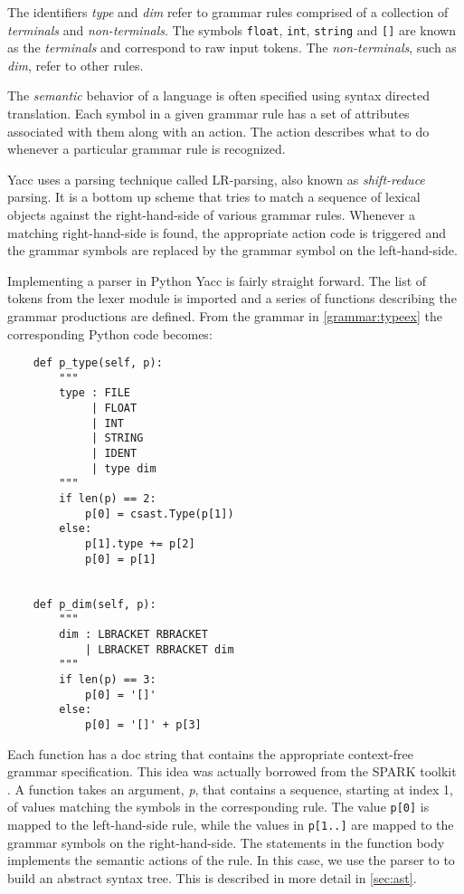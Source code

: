 \noindent The identifiers \emph{type} and \emph{dim} refer to grammar
rules comprised of a collection of \emph{terminals} and
\emph{non-terminals}. The symbols \texttt{float}, \texttt{int},
\texttt{string} and \texttt{[]} are known as the \emph{terminals}
and correspond to raw input tokens. The \emph{non-terminals}, such as
\emph{dim}, refer to other rules.

The \emph{semantic} behavior of a language is often specified using
syntax directed translation. Each symbol in a given grammar rule has a
set of attributes associated with them along with an action. The
action describes what to do whenever a particular grammar rule is
recognized.

Yacc uses a parsing technique called LR-parsing, also known as
\emph{shift-reduce} parsing. It is a bottom up scheme that tries to
match a sequence of lexical objects against the right-hand-side of
various grammar rules. Whenever a matching right-hand-side is found,
the appropriate action code is triggered and the grammar symbols are
replaced by the grammar symbol on the left-hand-side.

Implementing a parser in Python Yacc is fairly straight forward. The
list of tokens from the lexer module is imported and a series of
functions describing the grammar productions are defined. From the
grammar in \autoref{grammar:typeex} the corresponding Python code
becomes:

\begin{lstlisting}
    def p_type(self, p):
        """
        type : FILE
             | FLOAT
             | INT
             | STRING
             | IDENT
             | type dim
        """
        if len(p) == 2:
            p[0] = csast.Type(p[1])
        else:
            p[1].type += p[2]
            p[0] = p[1]


    def p_dim(self, p):
        """
        dim : LBRACKET RBRACKET
            | LBRACKET RBRACKET dim
        """
        if len(p) == 3:
            p[0] = '[]'
        else:
            p[0] = '[]' + p[3]
\end{lstlisting}

Each function has a doc string that contains the appropriate
context-free grammar specification. This idea was actually borrowed
from the SPARK toolkit \citep{spark:online}. A function takes an
argument, \emph{p}, that contains a sequence, starting at index 1, of
values matching the symbols in the corresponding rule. The value
\texttt{p[0]} is mapped to the left-hand-side rule, while the values
in \texttt{p[1..]} are mapped to the grammar symbols on the
right-hand-side. The statements in the function body implements the
semantic actions of the rule. In this case, we use the parser to to
build an abstract syntax tree. This is described in more detail in
\autoref{sec:ast}.


